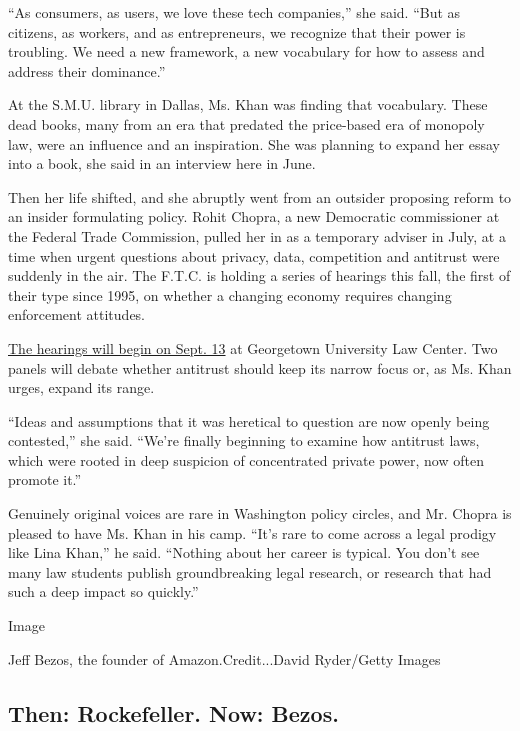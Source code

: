 ``As consumers, as users, we love these tech companies,'' she said.
``But as citizens, as workers, and as entrepreneurs, we recognize that
their power is troubling. We need a new framework, a new vocabulary for
how to assess and address their dominance.''

At the S.M.U. library in Dallas, Ms. Khan was finding that vocabulary.
These dead books, many from an era that predated the price-based era of
monopoly law, were an influence and an inspiration. She was planning to
expand her essay into a book, she said in an interview here in June.

Then her life shifted, and she abruptly went from an outsider proposing
reform to an insider formulating policy. Rohit Chopra, a new Democratic
commissioner at the Federal Trade Commission, pulled her in as a
temporary adviser in July, at a time when urgent questions about
privacy, data, competition and antitrust were suddenly in the air. The
F.T.C. is holding a series of hearings this fall, the first of their
type since 1995, on whether a changing economy requires changing
enforcement attitudes.

\href{https://www.ftc.gov/news-events/events-calendar/2018/09/ftc-hearing-1-competition-consumer-protection-21st-century}{The
hearings will begin on Sept. 13} at Georgetown University Law Center.
Two panels will debate whether antitrust should keep its narrow focus
or, as Ms. Khan urges, expand its range.

``Ideas and assumptions that it was heretical to question are now openly
being contested,'' she said. ``We're finally beginning to examine how
antitrust laws, which were rooted in deep suspicion of concentrated
private power, now often promote it.''

Genuinely original voices are rare in Washington policy circles, and Mr.
Chopra is pleased to have Ms. Khan in his camp. ``It's rare to come
across a legal prodigy like Lina Khan,'' he said. ``Nothing about her
career is typical. You don't see many law students publish
groundbreaking legal research, or research that had such a deep impact
so quickly.''

Image

Jeff Bezos, the founder of Amazon.Credit...David Ryder/Getty Images

\hypertarget{then-rockefeller-now-bezos}{%
\subsection{Then: Rockefeller. Now:
Bezos.}\label{then-rockefeller-now-bezos}}

